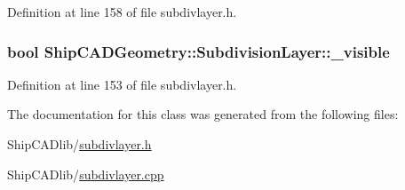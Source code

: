 Definition at line 158 of file subdivlayer.\-h.

\hypertarget{classShipCADGeometry_1_1SubdivisionLayer_aaf8127c4c895e6fb13d2281ae2e5e5ff}{
\subsubsection[{\-\_\-visible}]{\setlength{\rightskip}{0pt plus 5cm}bool Ship\-C\-A\-D\-Geometry\-::\-Subdivision\-Layer\-::\-\_\-visible\hspace{0.3cm}{\ttfamily [protected]}}}\label{classShipCADGeometry_1_1SubdivisionLayer_aaf8127c4c895e6fb13d2281ae2e5e5ff}


Definition at line 153 of file subdivlayer.\-h.



The documentation for this class was generated from the following files\-:\begin{DoxyCompactItemize}
\item 
Ship\-C\-A\-Dlib/\hyperlink{subdivlayer_8h}{subdivlayer.\-h}\item 
Ship\-C\-A\-Dlib/\hyperlink{subdivlayer_8cpp}{subdivlayer.\-cpp}\end{DoxyCompactItemize}
